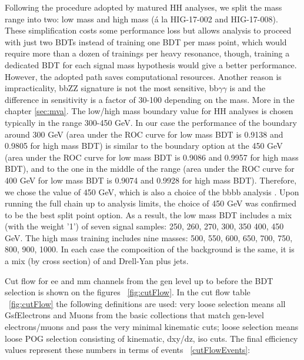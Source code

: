 Following the procedure adopted by matured HH analyses, we
split the mass range into two: low mass and high mass (\'a la HIG-17-002 and HIG-17-008). These simplification costs some performance loss but allows analysis to proceed with just two BDTs instead of training one BDT per mass point, which would require more than a dozen of trainings per heavy resonance, though, training a dedicated BDT for each
signal mass hypothesis would give a better performance. However, the adopted path saves computational resources. Another reason is impracticality, bbZZ
signature is not the most sensitive, bb$\gamma$$\gamma$ is and the difference in sensitivity is a factor of 30-100 depending on the mass. More in the chapter \ref{sec:mva}.
The low/high mass boundary value for HH analyses is chosen typically in the range 300-450
GeV. In our case the performance of the boundary around 300 GeV (area under the ROC curve
for low mass BDT is 0.9138 and 0.9805 for high mass BDT) is
similar to the boundary option at the 450 GeV (area under the ROC curve
for low mass BDT is 0.9086 and 0.9957 for high mass BDT), and to the one in the
middle of the range (area under the ROC curve
for 400 GeV for low mass BDT is 0.9074 and 0.9928 for high mass BDT). 
Therefore, we chose the value of 450 GeV, which
is also a choice of the bbbb analysis \cite{bbbb}. Upon running the full chain up to analysis limits, the choice of 450 GeV was confirmed to be the best split point option. As a result, the low
mass BDT includes a mix (with the weight '1') of seven signal samples:
250, 260, 270, 300, 350 400, 450 GeV. The high mass training includes nine
masses: 500, 550, 600, 650, 700, 750, 800, 900, 1000. In each case the
composition of the background is the same, it is a mix (by cross
section) of \ttbar and Drell-Yan plus jets.


Cut flow for ee and mm channels from the gen level up to before the BDT selection is shown on the figures ~\ref{fig:cutFlow}. In the cut flow table ~\ref{fig:cutFlow} the following definitions are used: very loose selection means all GsfElectrons and Muons from the basic collections that match gen-level electrons/muons and pass the very minimal kinematic cuts; loose selection means loose POG selection consisting of kinematic, dxy/dz, iso cuts. The final efficiency values represent these numbers in terms of events ~\ref{cutFlowEvents}:

